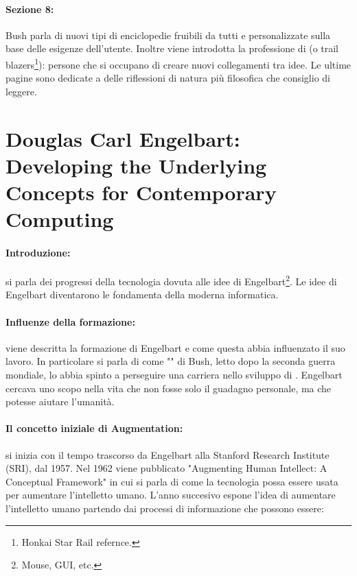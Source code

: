\paragraph{Sezione 8:} Bush parla di nuovi tipi di enciclopedie fruibili da tutti e personalizzate sulla base 
delle esigenze dell'utente. Inoltre viene introdotta la professione di  (o trail blazers\footnote{Honkai Star Rail refernce.}):
persone che si occupano di creare nuovi collegamenti tra idee. Le ultime pagine sono dedicate a delle riflessioni
di natura più filosofica che consiglio di leggere.

\section{Douglas Carl Engelbart: Developing the Underlying Concepts for Contemporary Computing}

\paragraph{Introduzione:} si parla dei progressi della tecnologia dovuta alle idee di Engelbart\footnote{
    Mouse, GUI, etc.
}. Le idee di Engelbart diventarono le fondamenta della moderna informatica.

\paragraph{Influenze della formazione:} viene descritta la formazione di Engelbart e come questa abbia influenzato il suo lavoro.
In particolare si parla di come "" di Bush, letto dopo la seconda guerra mondiale, lo abbia 
spinto a perseguire una carriera nello sviluppo di . Engelbart cercava
uno scopo nella vita che non fosse solo il guadagno personale, ma che potesse aiutare l'umanità.

\paragraph{Il concetto iniziale di Augmentation:} si inizia con il tempo trascorso da Engelbart alla Stanford Research Institute (SRI), dal 1957.
Nel 1962 viene pubblicato "Augmenting Human Intellect: A Conceptual Framework" in cui si parla di come la tecnologia
possa essere usata per aumentare l'intelletto umano. L'anno succesivo espone l'idea di aumentare l'intelletto umano
partendo dai processi di informazione che possono essere:

